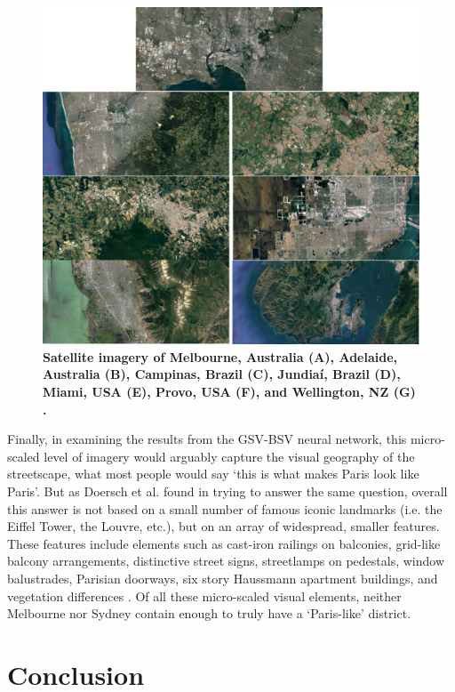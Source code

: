 \documentclass[Crown,sageh,times]{sagej}
\begin{document}
\begin{figure}[!htbp]
\centering    
\includegraphics[scale=0.35]{Images/PlosOne/Fig14.png} 
 \caption{\bf Satellite imagery of Melbourne, Australia (A), Adelaide, Australia (B), Campinas, Brazil (C), Jundia\'{i}, Brazil (D), Miami, USA (E), Provo, USA (F), and Wellington, NZ (G) \cite{GoogleStatic2017}.}    
 \label{fig:satimages}  
\end{figure} 

Finally, in examining the results from the GSV-BSV neural network, this micro-scaled level of imagery would arguably capture the visual geography of the streetscape, what most people would say `this is what makes Paris look like Paris'. But as Doersch et al. \cite{Doersch2012} found in trying to answer the same question, overall this answer is not based on a small number of famous iconic landmarks (i.e. the Eiffel Tower, the Louvre, etc.), but on an array of widespread, smaller features. These features include elements such as cast-iron railings on balconies, grid-like balcony arrangements, distinctive street signs, streetlamps on pedestals, window balustrades, Parisian doorways,  six story Haussmann apartment buildings, and vegetation differences \cite{Li2015}. Of all these micro-scaled visual elements, neither Melbourne nor Sydney contain enough to truly have a `Paris-like' district.

\section{Conclusion}\label{sec:conclusion}
\end{document}

